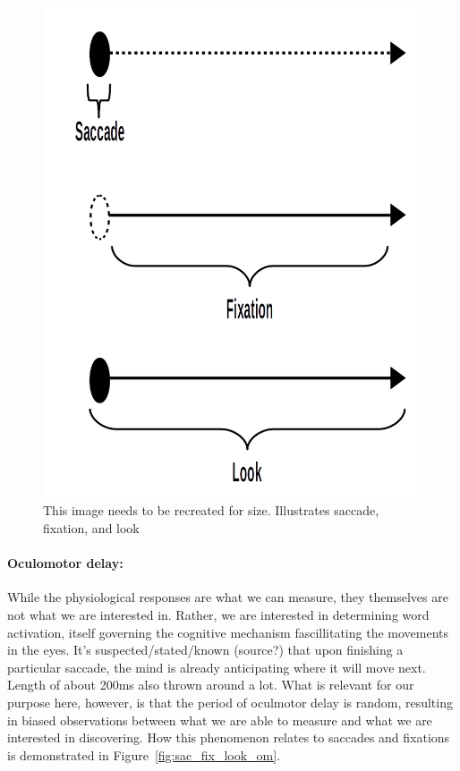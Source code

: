 \documentclass{article}
\begin{document}
\begin{figure}
\centering
\includegraphics[scale=0.25]{sac_fix_look.png}
\caption{This image needs to be recreated for size. Illustrates saccade, fixation, and look}
\label{fig:sac_fix_look}
\end{figure}

\paragraph{Oculomotor delay:} While the physiological responses are what we can measure, they themselves are not what we are interested in. Rather, we are interested in determining word activation, itself governing the cognitive mechanism fascillitating the movements in the eyes. It's suspected/stated/known (source?) that upon finishing a particular saccade, the mind is already anticipating where it will move next. Length of about 200ms also thrown around a lot. What is relevant for our purpose here, however, is that the period of oculmotor delay is random, resulting in biased observations between what we are able to measure and what we are interested in discovering. How this phenomenon relates to saccades and fixations is demonstrated in Figure~\ref{fig:sac_fix_look_om}.
\end{document}
